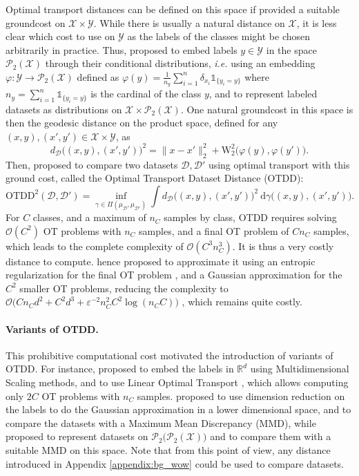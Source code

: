 \documentclass[twoside]{article}
\newcommand{\cP}{\mathcal{P}}
\newcommand{\cD}{\mathcal{D}}
\newcommand{\cX}{\mathcal{X}}
\newcommand{\cY}{\mathcal{Y}}
\newcommand{\cO}{\mathcal{O}}
\newcommand{\cPP}[1]{\mathcal{P}_2\big(\cP_2(#1)\big)}
\newcommand{\otdd}{\mathrm{OTDD}}
\newcommand{\W}{\mathrm{W}}
\newcommand{\R}{\mathbb{R}}
\begin{document}
Optimal transport distances can be defined on this space if provided a suitable groundcost on $\cX\times \cY$. While there is usually a natural distance on $\cX$, it is less clear which cost to use on $\cY$ as the labels of the classes might be chosen arbitrarily in practice. Thus, \citet{alvarez2020geometric} proposed to embed labels $y\in\cY$ in the space $\cP_2(\cX)$ through their conditional distributions, \emph{i.e.} using an embedding $\varphi:\cY\to\cP_2(\cX)$ defined as $\varphi(y) = \frac{1}{n_y}\sum_{i=1}^n \delta_{x_i}\mathbb{1}_{\{y_i=y\}}$ where $n_y=\sum_{i=1}^n \mathbb{1}_{\{y_i=y\}}$ is the cardinal of the class $y$, and to represent labeled datasets as distributions on $\cX\times \cP_2(\cX)$. One natural groundcost in this space is then the geodesic distance on the product space, defined for any $(x,y), (x',y') \in \cX\times \cY$, as
\begin{equation}
    d_{\cD}\big((x,y), (x',y')\big)^2 = \|x-x'\|_2^2 + \W_2^2\big(\varphi(y), \varphi(y')\big).
\end{equation}
Then, \citet{alvarez2020geometric} proposed to compare two datasets $\cD, \cD'$ using optimal transport with this ground cost, called the Optimal Transport Dataset Distance (OTDD):
\begin{equation}
    \otdd^2(\cD, \cD') = \inf_{\gamma\in\Pi(\mu_\cD,\mu_{\cD'})} \int d_{\cD}\big((x,y),(x',y')\big)^2\ \mathrm{d}\gamma\big((x,y), (x',y')\big).
    \label{def:otdd}
\end{equation}
For $C$ classes, and a maximum of $n_C$ samples by class, OTDD requires solving $\cO(C^2)$ OT problems with $n_C$ samples, and a final OT problem of $Cn_C$ samples, which leads to the complete complexity of $\cO(C^3 n_C^3)$. It is thus a very costly distance to compute. \citet{alvarez2020geometric} hence proposed to approximate it using an entropic regularization for the final OT problem \citep{cuturi2013sinkhorn}, and a Gaussian approximation for the $C^2$ smaller OT problems, reducing the complexity to $\cO\big(Cn_Cd^2+C^2d^3 + \varepsilon^{-2}n_C^2C^2\log (n_C C)\big)$ \citep{dvurechensky2018computational}, which remains quite costly. 


\paragraph{Variants of OTDD.}

This prohibitive computational cost motivated the introduction of variants of OTDD. For instance, \citet{liu2025wasserstein} proposed to embed the labels in $\R^d$ using Multidimensional Scaling methods, and to use Linear Optimal Transport \citep{wang2013linear}, which allows computing only $2C$ OT problems with $n_C$ samples. \citet{hua2023dynamic} proposed to use dimension reduction on the labels to do the Gaussian approximation in a lower dimensional space, and to compare the datasets with a Maximum Mean Discrepancy (MMD), while \citet{bonet2025flowing} proposed to represent datasets on $\cPP{\cX}$ and to compare them with a suitable MMD on this space. Note that from this point of view, any distance introduced in Appendix \ref{appendix:bg_wow} could be used to compare datasets.
\end{document}
